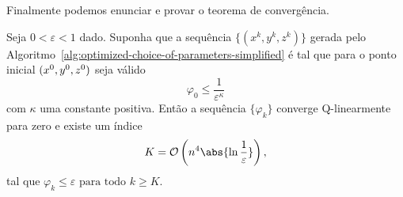 








Finalmente podemos enunciar e provar o teorema de convergência. 


\begin{teo}
	\label{teo:alg-convergence-varphi} Seja $0 < \varepsilon <1$ dado. Suponha que a sequência $\{(x^{k},y^{k},z^{k})\}$ gerada pelo Algoritmo~\ref{alg:optimized-choice-of-parameters-simplified} é  tal que 
	para o ponto inicial $(x^0,y^0,z^0)$ seja válido	
	\begin{equation}
	\label{eq:varphi0-eps-kappa}
		\varphi_{0}\leq \dfrac{1}{\varepsilon^{\kappa}}
	\end{equation} 
	com  $\kappa$ uma constante positiva. Então a sequência $\{\varphi_{k}\}$ converge Q-linearmente para zero e existe um índice \[K =  \Oset\left(n^{4}\abs{\ln\frac{1}{\varepsilon}}\right),\] tal que 
	 $\varphi_{k}\leq \varepsilon \text{ para todo } k \geq K$.
	 
\end{teo}

